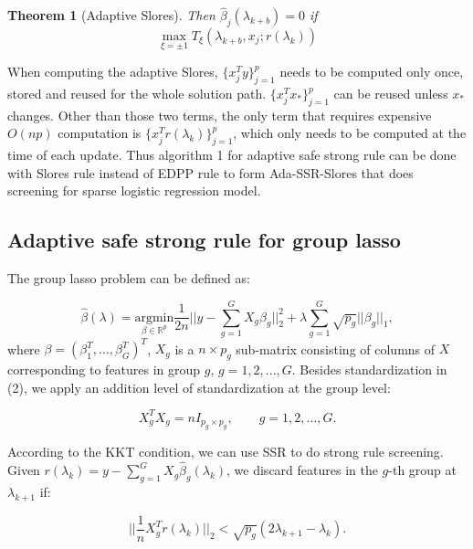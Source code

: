 \documentclass{article}
\newtheorem{theorem}{Theorem}[section]
\begin{document}
\begin{theorem}[Adaptive Slores]
Then $\hat{\beta}_j(\lambda_{k+b})=0$ if
        \begin{equation}
            \max_{\xi=\pm1} T_\xi(\lambda_{k+b},x_j;r(\lambda_k))
        \end{equation}
\end{theorem}

When computing the adaptive Slores, $\{x_j^Ty\}_{j=1}^p$ needs to be computed only once, stored and reused for the whole solution path. $\{x_j^Tx_*\}_{j=1}^p$ can be reused unless $x_*$ changes. Other than those two terms, the only term that requires expensive $O(np)$ computation is $\{x_j^Tr(\lambda_k)\}_{j=1}^p$, which only needs to be computed at the time of each update. Thus algorithm 1 for adaptive safe strong rule can be done with Slores rule instead of EDPP rule to form Ada-SSR-Slores that does screening for sparse logistic regression model.

\subsection{Adaptive safe strong rule for group lasso}

The group lasso problem \citep{yuan2006model} can be defined as:

\begin{equation}
    \hat{\beta}(\lambda) = \underset{\beta\in \mathbb{R}^p}{\mathrm{argmin}}\frac{1}{2n}\bigg|\bigg|y-\sum_{g=1}^GX_g\beta_g\bigg|\bigg|_2^2+\lambda\sum_{g=1}^G\sqrt{p_g}||\beta_g||_1,
\end{equation}
where $\beta=(\beta_1^T,...,\beta_G^T)^T$, $X_g$ is a $n\times p_g$ sub-matrix consisting of columns of $X$ corresponding to features in group $g$, $g=1,2,...,G$. Besides standardization in (2), we apply an addition level of standardization at the group level\citep{breheny2015group}:

\begin{equation}
    X_g^TX_g=nI_{p_g\times p_g},\qquad g=1,2,...,G.
\end{equation}

According to the KKT condition, we can use SSR to do strong rule screening. Given $r(\lambda_k)=y-\sum_{g=1}^GX_g\hat{\beta}_g(\lambda_k)$, we discard features in the $g$-th group at $\lambda_{k+1}$ if:

\begin{equation}
    \bigg|\bigg|\frac{1}{n}X_g^Tr(\lambda_k)\bigg|\bigg|_2<\sqrt{p_g}(2\lambda_{k+1}-\lambda_k).
\end{equation}
\end{document}
